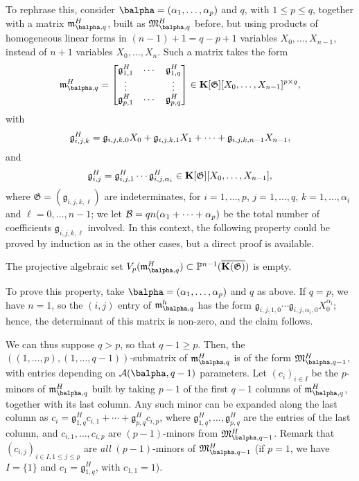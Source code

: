 \documentclass[12pt]{article}
\begin{document}
To rephrase this, consider $\balpha=(\alpha_1,\dots,\alpha_p)$ and
$q$, with $1 \le p \le q$, together with a matrix
$\mathfrak{m}^H_{\balpha,q}$, built as $\mathfrak{M}^H_{\balpha,q}$
before, but using products of homogeneous linear forms in $(n-1)+1=q-p+1$
variables $X_0,\dots,X_{n-1}$, instead of $n+1$ variables
$X_0,\dots,X_n$. Such a matrix takes the form
\begin{align}\label{eq:matM2}
\mathfrak{m}^H_{\balpha,q}=\left [\begin{matrix}
\mathfrak{g}^H_{1,1} & \cdots & \mathfrak{g}^H_{1,q}\\
 \vdots & & \vdots\\
\mathfrak{g}^H_{p,1} & \cdots & \mathfrak{g}^H_{p,q}
  \end{matrix}\right ]\in \KK[\mathfrak{G}][X_0,\dots,X_{n-1}]^{p\times q},
\end{align}
with 
$$\mathfrak{g}^H_{i,j,k} = \frak{g}_{i,j,k,0}X_0 + \frak{g}_{i,j,k,1} X_1 +\cdots + \frak{g}_{i,j,k,n-1} X_{n-1},$$
and
$$\mathfrak{g}^H_{i,j} = \mathfrak{g}^H_{i,j,1} \cdots
\mathfrak{g}^H_{i,j,\alpha_i} \in \mathbf{K}[\mathfrak{G}][X_0,\dots,X_{n-1}],$$
where $\mathfrak{G}=(\mathfrak{g}_{i,j,k,\ell})$ are indeterminates,
for $i=1,\dots,p$, $j=1,\dots,q$, $k=1,\dots,\alpha_i$ and
$\ell=0,\dots,n-1$; we let ${\cal B}=q n (\alpha_1+\cdots +\alpha_p)$ be the total
number of coefficients $\mathfrak{g}_{i,j,k,\ell}$ involved. In this context, the
following property could be proved by induction as in the other cases,
but a direct proof is available.

\begin{description}[leftmargin=*]
\item[$\assI_3(\balpha,q).$] The projective algebraic set
  $V_p(\mathfrak{m}^H_{\balpha,q}) \subset \P^{n-1}(\KKCbar)$ is empty.
\end{description}
To prove this property, take $\balpha=(\alpha_1,\dots,\alpha_p)$ and
$q$ as above. If $q=p$, we have $n=1$, so the $(i,j)$ entry of
$\mathfrak{m}^h_{\balpha,q}$ has the form
$\mathfrak{g}_{i,j,1,0}\cdots\mathfrak{g}_{i,j,\alpha_i,0}
X_0^{\alpha_i}$; hence, the determinant of this matrix is non-zero,
and the claim follows.

We can thus suppose $q > p$, so that $q-1 \ge p$.  Then, the
$((1,\dots,p),(1,\dots,q-1))$-submatrix of $\mathfrak{m}^H_{\balpha,q}$ is
of the form $\mathfrak{M}^H_{\balpha,q-1}$, with entries depending on
${\cal A}(\balpha,q-1)$ parameters.  Let $(c_i)_{i \in I}$ be the $p$-minors
of $\mathfrak{m}^H_{\balpha,q}$ built by taking $p-1$ of the first $q-1$
columns of $\mathfrak{m}^H_{\balpha,q}$, together with its last column.
Any such minor can be expanded along the last column as $c_i =
\mathfrak{g}^H_{1,q} c_{i,1} + \cdots + \mathfrak{g}^H_{p,q}
c_{i,p}$, where $\mathfrak{g}^H_{1,q},\dots,\mathfrak{g}^H_{p,q}$ are
the entries of the last column, and $c_{i,1},\dots,c_{i,p}$
are $(p-1)$-minors from $\mathfrak{M}^H_{\balpha,q-1}$. Remark that
$(c_{i,j})_{i \in I, 1 \le j \le p}$ are {\em all} $(p-1)$-minors
of $\mathfrak{M}^H_{\balpha,q-1}$ (if $p=1$, we have $I=\{1\}$ and
$c_1=\mathfrak{g}^H_{1,q}$, with $c_{1,1}=1$).
\end{document}
